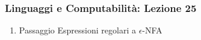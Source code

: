 




\begin{frame}[fragile]
	\frametitle{Linguaggi e Computabilità: Lezione 25}
\begin{enumerate}
\item
Passaggio Espressioni regolari a $\epsilon$-NFA
\end{enumerate}
\end{frame}



